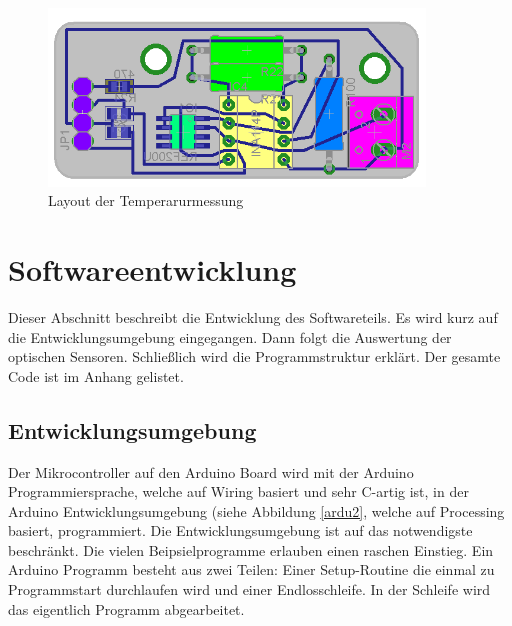 \documentclass[a4paper,bibtotoc,oneside]{scrbook}
\begin{document}
\begin{figure}[htbp]
\centering
\includegraphics[width=100mm]{img/tmess2.png}
\caption{Layout der Temperarurmessung}\label{tmess2}
\end{figure}






\section{Softwareentwicklung}\thispagestyle{empty}
Dieser Abschnitt beschreibt die Entwicklung des Softwareteils. Es wird kurz auf die Entwicklungsumgebung eingegangen. Dann folgt die Auswertung der optischen Sensoren. Schließlich wird die Programmstruktur erklärt. Der gesamte Code ist im Anhang gelistet.

\subsection{Entwicklungsumgebung}\thispagestyle{empty}
Der Mikrocontroller auf den Arduino Board wird mit der Arduino Programmiersprache, welche auf Wiring basiert und sehr C-artig ist, in der Arduino Entwicklungsumgebung (siehe Abbildung \ref{ardu2}, welche auf Processing basiert, programmiert. Die Entwicklungsumgebung ist auf das notwendigste beschränkt. Die vielen Beipsielprogramme erlauben einen raschen Einstieg.
Ein Arduino Programm besteht aus zwei Teilen: Einer Setup-Routine die einmal zu Programmstart durchlaufen wird und einer Endlosschleife. In der Schleife wird das eigentlich Programm abgearbeitet. 
\end{document}
